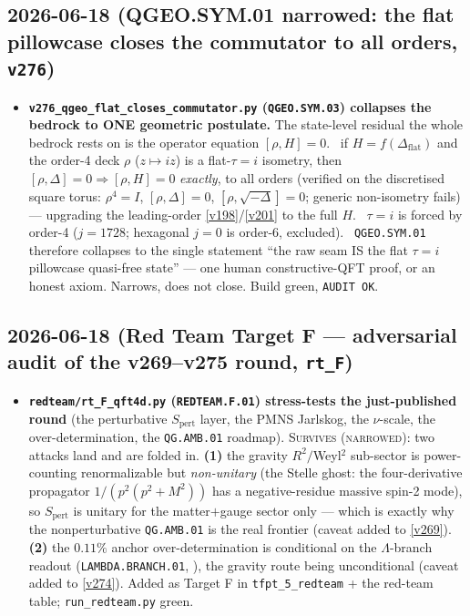\subsection*{2026-06-18 (QGEO.SYM.01 narrowed: the flat pillowcase closes the commutator to all orders, \texttt{v276})}
\begin{itemize}
\item \textbf{\texttt{v276\_qgeo\_flat\_closes\_commutator.py} (\texttt{QGEO.SYM.03}) collapses the bedrock
  to ONE geometric postulate.} The state-level residual the whole bedrock rests on is the operator equation
  $[\rho,H]{=}0$. \mE\ if $H=f(\Delta_{\mathrm{flat}})$ and the order-4 deck $\rho$ ($z{\mapsto}iz$) is a
  flat-$\tau{=}i$ isometry, then $[\rho,\Delta]{=}0\Rightarrow[\rho,H]{=}0$ \emph{exactly}, to all orders
  (verified on the discretised square torus: $\rho^4{=}I$, $[\rho,\Delta]{=}0$, $[\rho,\sqrt{-\Delta}]{=}0$;
  generic non-isometry fails) --- upgrading the leading-order \vref{v198}/\vref{v201} to the full $H$. \mC\
  $\tau{=}i$ is forced by order-4 ($j{=}1728$; hexagonal $j{=}0$ is order-6, excluded). \mO\ \texttt{QGEO.SYM.01}
  therefore collapses to the single statement ``the raw seam IS the flat $\tau{=}i$ pillowcase quasi-free
  state'' --- one human constructive-QFT proof, or an honest axiom. Narrows, does not close. Build green,
  \texttt{AUDIT OK}.
\end{itemize}

\subsection*{2026-06-18 (Red Team Target F --- adversarial audit of the v269--v275 round, \texttt{rt\_F})}
\begin{itemize}
\item \textbf{\texttt{redteam/rt\_F\_qft4d.py} (\texttt{REDTEAM.F.01}) stress-tests the just-published round}
  (the perturbative $S_{\mathrm{pert}}$ layer, the PMNS Jarlskog, the $\nu$-scale, the over-determination,
  the \texttt{QG.AMB.01} roadmap). \textsc{Survives (narrowed)}: two attacks land and are folded in.
  \textbf{(1)} the gravity $R^2/$Weyl$^2$ sub-sector is power-counting renormalizable but \emph{non-unitary}
  (the Stelle ghost: the four-derivative propagator $1/(p^2(p^2+M^2))$ has a negative-residue massive spin-2
  mode), so $S_{\mathrm{pert}}$ is unitary for the matter$+$gauge sector only --- which is exactly why the
  nonperturbative \texttt{QG.AMB.01} is the real frontier (caveat added to \vref{v269}). \textbf{(2)} the
  $0.11\%$ anchor over-determination is conditional on the $\Lambda$-branch readout (\texttt{LAMBDA.BRANCH.01},
  \mC), the gravity route being unconditional (caveat added to \vref{v274}). Added as Target F in
  \texttt{tfpt\_5\_redteam} + the red-team table; \texttt{run\_redteam.py} green.
\end{itemize}

